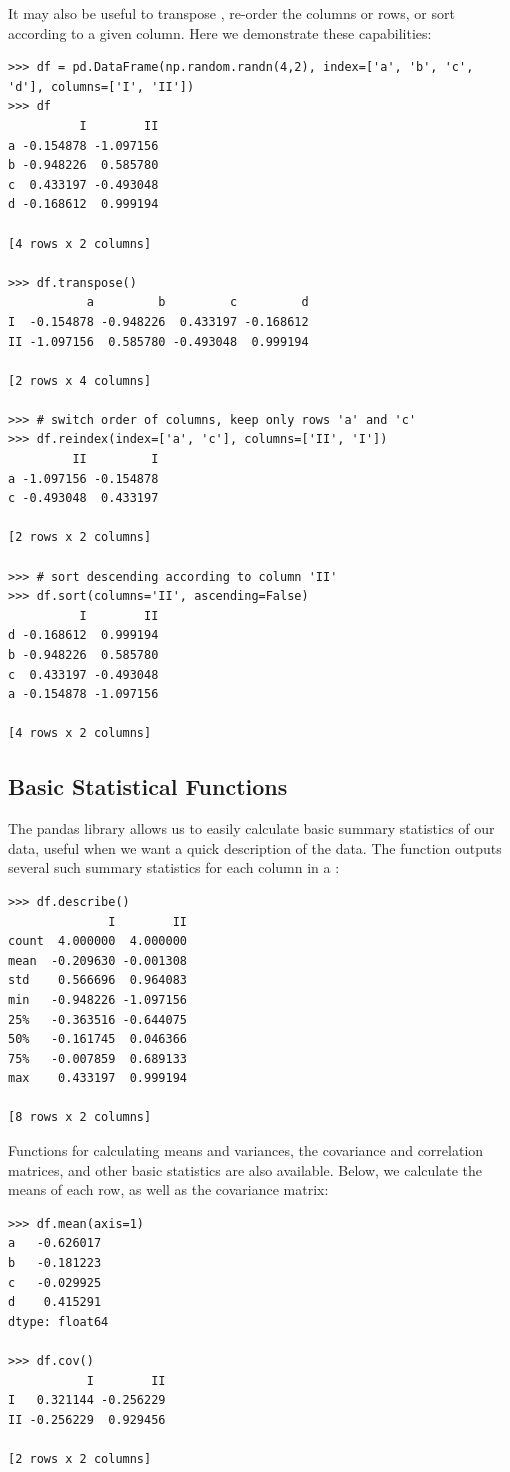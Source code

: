 It may also be useful to transpose , re-order the columns or rows, or sort according to a 
given column. Here we demonstrate these capabilities:
\begin{lstlisting}
>>> df = pd.DataFrame(np.random.randn(4,2), index=['a', 'b', 'c', 'd'], columns=['I', 'II'])
>>> df
          I        II
a -0.154878 -1.097156
b -0.948226  0.585780
c  0.433197 -0.493048
d -0.168612  0.999194

[4 rows x 2 columns]

>>> df.transpose()
           a         b         c         d
I  -0.154878 -0.948226  0.433197 -0.168612
II -1.097156  0.585780 -0.493048  0.999194

[2 rows x 4 columns]

>>> # switch order of columns, keep only rows 'a' and 'c'
>>> df.reindex(index=['a', 'c'], columns=['II', 'I'])
         II         I
a -1.097156 -0.154878
c -0.493048  0.433197

[2 rows x 2 columns]

>>> # sort descending according to column 'II'
>>> df.sort(columns='II', ascending=False)
          I        II
d -0.168612  0.999194
b -0.948226  0.585780
c  0.433197 -0.493048
a -0.154878 -1.097156

[4 rows x 2 columns]
\end{lstlisting}

\subsection*{Basic Statistical Functions}
The pandas library allows us to easily calculate basic summary statistics of our data, 
useful when we want a quick description of the data. The  function
outputs several such summary statistics for each column in a :
\begin{lstlisting}
>>> df.describe()
              I        II
count  4.000000  4.000000
mean  -0.209630 -0.001308
std    0.566696  0.964083
min   -0.948226 -1.097156
25%   -0.363516 -0.644075
50%   -0.161745  0.046366
75%   -0.007859  0.689133
max    0.433197  0.999194

[8 rows x 2 columns]
\end{lstlisting}

Functions for calculating means and variances, the covariance and correlation matrices, and other 
basic statistics are also available. Below, we calculate the means of each row, as well as the
covariance matrix:
\begin{lstlisting}
>>> df.mean(axis=1)
a   -0.626017
b   -0.181223
c   -0.029925
d    0.415291
dtype: float64

>>> df.cov()
           I        II
I   0.321144 -0.256229
II -0.256229  0.929456

[2 rows x 2 columns]
\end{lstlisting}

